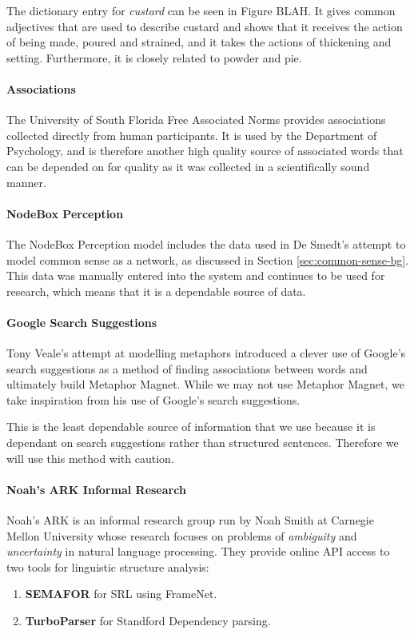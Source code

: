 The dictionary entry for \textit{custard} can be seen in Figure BLAH. It gives common adjectives that are used to describe custard and shows that it receives the action of being made, poured and strained, and it takes the actions of thickening and setting. Furthermore, it is closely related to powder and pie.


\paragraph{Associations}
The University of South Florida Free Associated Norms\cite{nelson2004university} provides associations collected directly from human participants. It is used by the Department of Psychology, and is therefore another high quality source of associated words that can be depended on for quality as it was collected in a scientifically sound manner.


\paragraph{NodeBox Perception}
The NodeBox Perception model includes the data used in De Smedt's attempt to model common sense as a network, as discussed in Section \ref{sec:common-sense-bg}. This data was manually entered into the system and continues to be used for research, which means that it is a dependable source of data. 

\paragraph{Google Search Suggestions}
Tony Veale's attempt at modelling metaphors\cite{vealespecifying} introduced a clever use of Google's search suggestions as a method of finding associations between words and ultimately build Metaphor Magnet. While we may not use Metaphor Magnet, we take inspiration from his use of Google's search suggestions.

This is the least dependable source of information that we use because it is dependant on search suggestions rather than structured sentences. Therefore we will use this method with caution.

\paragraph{Noah's ARK Informal Research}
Noah's ARK is an informal research group run by Noah Smith at Carnegie Mellon University\cite{ark} whose research focuses on problems of \textit{ambiguity} and \textit{uncertainty} in natural language processing. They provide online API access to two tools for linguistic structure analysis:
\begin{enumerate}
\item{\textbf{SEMAFOR}\cite{chen2010semafor} for SRL using FrameNet.}
\item{\textbf{TurboParser}\cite{turboparser} for Standford Dependency parsing.}
\end{enumerate}   

